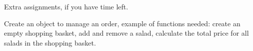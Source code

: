 \documentclass[fleqn, article, a4paper]{memoir}
\begin{document}
\noindent Extra assignments, if you have time left.
\begin{Assignments}

\item Create an object to manage an order, example of functions needed: create an empty shopping basket, add and remove a salad, calculate the total price for all salads in the shopping basket.

\end{Assignments}


\end{document}
